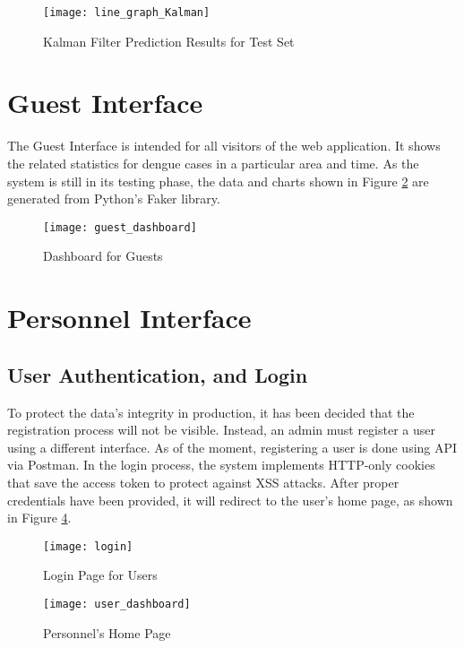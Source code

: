 \begin{figure}[H]
	\centering
	\texttt{[image: line\_graph\_Kalman]}
	\caption{Kalman Filter Prediction Results for Test Set}
	\label{fig:Kalman_result}
\end{figure}
\clearpage

\section{Guest Interface}

The Guest Interface is intended for all visitors of the web application. It shows the related statistics for dengue cases in a particular area and time. As the system is still in its testing phase, the data and charts shown in Figure \ref{fig:guest_dashboard} are generated from Python's Faker library. 

\begin{figure}[H]
	\centering
	\texttt{[image: guest\_dashboard]}
	\caption{Dashboard for Guests}
	\label{fig:guest_dashboard}
\end{figure}

\section{Personnel Interface}

\subsection{User Authentication, and Login}
To protect the data's integrity in production, it has been decided that the registration process will not be visible. Instead, an admin must register a user using a different interface. As of the moment, registering a user is done using API via Postman. In the login process, the system implements HTTP-only cookies that save the access token to protect against XSS attacks. After proper credentials have been provided, it will redirect to the user's home page, as shown in Figure \ref{fig:user_dashboard}.

\begin{figure}[H]
	\centering
	\texttt{[image: login]}
	\caption{Login Page for Users}
	\label{fig:login_page}
\end{figure}

\begin{figure}[H]
	\centering
	\texttt{[image: user\_dashboard]}
	\caption{Personnel's Home Page}
	\label{fig:user_dashboard}
\end{figure}


